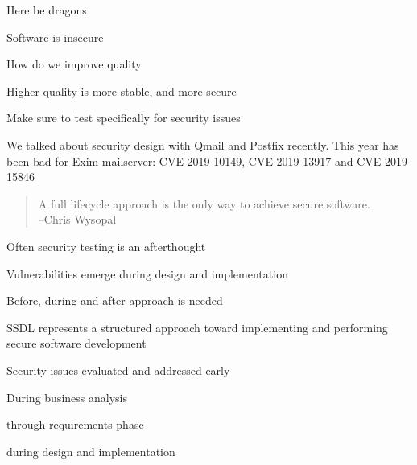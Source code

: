 \documentclass[Screen16to9,17pt]{foils}
\begin{document}





Here be dragons
\begin{list2}
\item Software is insecure
\item How do we improve quality
\item Higher quality is more stable, and more secure
\item Make sure to test specifically for security issues
\end{list2}

We talked about security design with Qmail and Postfix recently. This year has been bad for Exim mailserver: CVE-2019-10149, CVE-2019-13917 and CVE-2019-15846




\begin{quote}
  A full lifecycle approach is the only way to achieve secure software.\\
  --Chris Wysopal
\end{quote}

\begin{list2}
\item Often security testing is an afterthought
\item Vulnerabilities emerge during design and implementation
\item Before, during and after approach is needed
\end{list2}


\begin{list2}
\item SSDL represents a structured approach toward implementing and performing secure software development
\item Security issues evaluated and addressed early
\item During business analysis
\item through requirements phase
\item during design and implementation
\end{list2}

\end{document}
